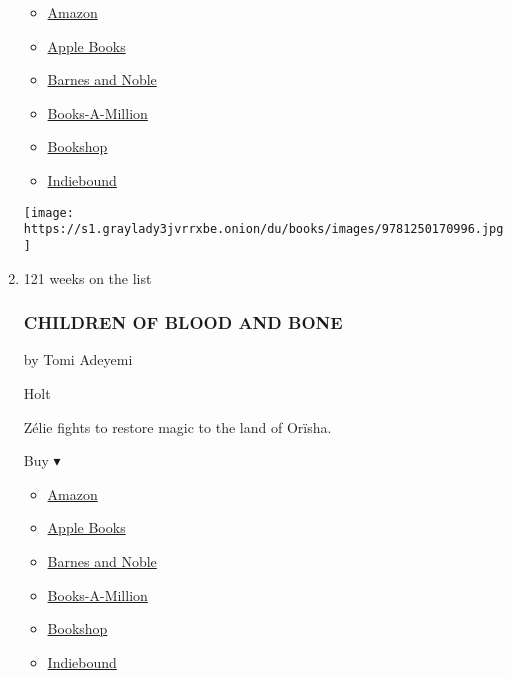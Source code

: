 \begin{enumerate}
  \begin{itemize}
  \tightlist
  \item
    \href{https://www.amazon.com/Children-Virtue-Vengeance-Legacy-Orisha/dp/1250170990?tag=NYTBS-20}{Amazon}
  \item
    \href{https://du-gae-books-dot-nyt-du-prd.appspot.com/buy?title=CHILDREN+OF+VIRTUE+AND+VENGEANCE\&author=Tomi+Adeyemi}{Apple
    Books}
  \item
    \href{https://www.anrdoezrs.net/click-7990613-11819508?url=https\%3A\%2F\%2Fwww.barnesandnoble.com\%2Fw\%2F\%3Fean\%3D9781250170996}{Barnes
    and Noble}
  \item
    \href{https://www.anrdoezrs.net/click-7990613-35140?url=https\%3A\%2F\%2Fwww.booksamillion.com\%2Fp\%2FCHILDREN\%2BOF\%2BVIRTUE\%2BAND\%2BVENGEANCE\%2FTomi\%2BAdeyemi\%2F9781250170996}{Books-A-Million}
  \item
    \href{https://bookshop.org/a/3546/9781250170996}{Bookshop}
  \item
    \href{https://www.indiebound.org/book/9781250170996?aff=NYT}{Indiebound}
  \end{itemize}

  \texttt{[image: https://s1.graylady3jvrrxbe.onion/du/books/images/9781250170996.jpg]}
\item
  121 weeks on the list

  \hypertarget{children-of-blood-and-bone}{%
  \subsubsection{CHILDREN OF BLOOD AND
  BONE}\label{children-of-blood-and-bone}}

  by Tomi Adeyemi

  Holt

  Zélie fights to restore magic to the land of Orïsha.

  Buy ▾

  \begin{itemize}
  \tightlist
  \item
    \href{https://www.amazon.com/Children-Blood-Bone-Legacy-Orisha/dp/1250170974?tag=NYTBS-20}{Amazon}
  \item
    \href{https://du-gae-books-dot-nyt-du-prd.appspot.com/buy?title=CHILDREN+OF+BLOOD+AND+BONE\&author=Tomi+Adeyemi}{Apple
    Books}
  \item
    \href{https://www.anrdoezrs.net/click-7990613-11819508?url=https\%3A\%2F\%2Fwww.barnesandnoble.com\%2Fw\%2F\%3Fean\%3D9781250170972}{Barnes
    and Noble}
  \item
    \href{https://www.anrdoezrs.net/click-7990613-35140?url=https\%3A\%2F\%2Fwww.booksamillion.com\%2Fp\%2FCHILDREN\%2BOF\%2BBLOOD\%2BAND\%2BBONE\%2FTomi\%2BAdeyemi\%2F9781250170972}{Books-A-Million}
  \item
    \href{https://bookshop.org/a/3546/9781250170972}{Bookshop}
  \item
    \href{https://www.indiebound.org/book/9781250170972?aff=NYT}{Indiebound}
  \end{itemize}


\end{enumerate}
